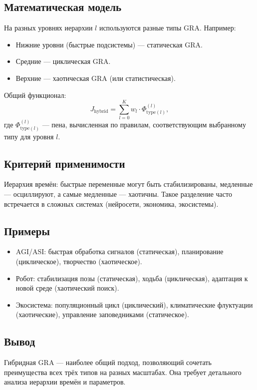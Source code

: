 \documentclass[12pt,a4paper]{article}
\begin{document}
\subsection{Математическая модель}

На разных уровнях иерархии $l$ используются разные типы GRA. Например:
\begin{itemize}
    \item Нижние уровни (быстрые подсистемы) — статическая GRA.
    \item Средние — циклическая GRA.
    \item Верхние — хаотическая GRA (или статистическая).
\end{itemize}

Общий функционал:
\begin{equation}
    J_{\text{hybrid}} = \sum_{l=0}^{K} w_l \cdot \Phi_{\text{type}(l)}^{(l)},
\end{equation}
где $\Phi_{\text{type}(l)}^{(l)}$ — пена, вычисленная по правилам, соответствующим выбранному типу для уровня $l$.

\subsection{Критерий применимости}

Иерархия времён: быстрые переменные могут быть стабилизированы, медленные — осциллируют, а самые медленные — хаотичны. Такое разделение часто встречается в сложных системах (нейросети, экономика, экосистемы).

\subsection{Примеры}
\begin{itemize}
    \item AGI/ASI: быстрая обработка сигналов (статическая), планирование (циклическое), творчество (хаотическое).
    \item Робот: стабилизация позы (статическая), ходьба (циклическая), адаптация к новой среде (хаотический поиск).
    \item Экосистема: популяционный цикл (циклический), климатические флуктуации (хаотические), управление заповедниками (статическое).
\end{itemize}

\subsection{Вывод}
Гибридная GRA — наиболее общий подход, позволяющий сочетать преимущества всех трёх типов на разных масштабах. Она требует детального анализа иерархии времён и параметров.
\end{document}
